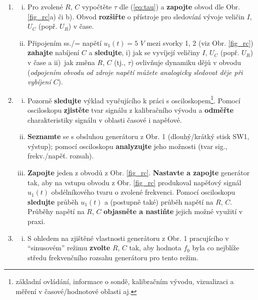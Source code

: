 \documentclass[a4paper, 11pt]{report}
\begin{document}
\vspace{-4mm}

\begin{enumerate}[\bf {Experiment} 1:]
\item


\begin{enumerate}[i)]

\item 
Pro zvolené $R$, $C$ vypočtěte $\tau$ dle (\ref{eq:tau}) a {\bf zapojte} obvod dle Obr. \ref{fig_rc}a) či b).
Obvod {\bf rozšiřte} o přístroje pro
sledování
vývoje veličin $I$, $U_C$ (popř. $U_R$) v čase.

\item
Připojením ss./= napětí $u_1(t) = 5$ $V$ 
mezi svorky 1, 2 (viz Obr. \ref{fig_rc}) 
{\bf zahajte} nabíjení $C$
a 
{\bf sledujte}, 
i) jak se vyvíjejí veličiny $I$, $U_C$ (popř. $U_R$) v čase a 
ii)~jak změna $R$, $C$ (tj., $\tau$) ovlivňuje dynamiku dějů v obvodu 
({\it odpojením obvodu od zdroje napětí
můžete analogicky sledovat děje při vybíjení $C$}).


\end{enumerate}

\item

\begin{enumerate}[i)]
\item 
Pozorně {\bf sledujte} výklad vyučujícího k práci s osciloskopem\footnote{základní ovládání, informace o sondě, kalibračním vývodu, vizualizaci a měření v časové/hodnotové oblasti aj.}. 
Pomocí osciloskopu {\bf zjistěte} tvar signálu z kalibračního vývodu a 
{\bf odměřte} charakteristiky signálu v oblasti časové 
i 
napěťové. 

\item
{\bf Seznamte} se s obsluhou generátoru z Obr. 1 (dlouhý/krátký stisk SW1, výstup); 
pomocí osciloskopu {\bf analyzujte} jeho možnosti (tvar sig., frekv./napěť. rozsah).

\item 
{\bf Zapojte} jeden z obvodů z Obr. \ref{fig_rc}.
{\bf Nastavte a zapojte} generátor tak, 
aby na vstupu obvodu z Obr. \ref{fig_rc} produkoval napěťový signál $u_1(t)$ obdélníkového tvaru o zvolené frekvenci.
Pomocí osciloskopu {\bf sledujte} průběh $u_1(t)$  a 
(postupně také) průběh napětí na $R$, $C$. Průběhy napětí na $R$, $C$ {\bf objasněte
a nastiňte} jejich možné využití v praxi.

\end{enumerate}

\item
\begin{enumerate}[i)]
\item 
S ohledem na zjištěné vlastnosti generátoru z Obr. 1 pracujícího v ``sinusovém'' režimu
{\bf zvolte} $R$, $C$
tak, aby hodnota $f_0$ 
byla co nejblíže středu frekvenčního rozsahu generátoru pro tento režim. 


\end{enumerate}
\end{enumerate}
\end{document}
